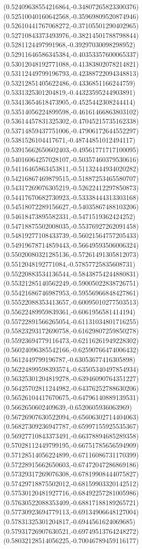 \documentclass[12pt]{article}
\theoremstyle{plain}
\theoremstyle{definition}
\theoremstyle{remark}
\begin{document}
\begin{figure}
{  (0.52409638554216864,-0.34807265823300376)%
  (0.52510040160642568,-0.35969809520874946)%
  (0.52610441767068272,-0.37105501290402965)%
  (0.52710843373493976,-0.38214501788798844)%
  (0.5281124497991968,-0.39297030098298952)%
  (0.52911646586345384,-0.40353357600065337)%
  (0.53012048192771088,-0.41383802078214821)%
  (0.53112449799196793,-0.42388722094348813)%
  (0.53212851405622486,-0.4336851166244759)%
  (0.5331325301204819,-0.44323595244903891)%
  (0.53413654618473905,-0.4525442308244414)%
  (0.53514056224899598,-0.46161466863803102)%
  (0.53614457831325302,-0.47045215735162338)%
  (0.53714859437751006,-0.47906172644552297)%
  (0.5381526104417671,-0.48744851012494117)%
  (0.53915662650602403,-0.49561771717100095)%
  (0.54016064257028107,-0.50357460379530616)%
  (0.54116465863453811,-0.51132444934020282)%
  (0.54216867469879515,-0.51887253465580707)%
  (0.54317269076305219,-0.52622412297850873)%
  (0.54417670682730923,-0.53338444313303168)%
  (0.54518072289156627,-0.54035867488103206)%
  (0.54618473895582331,-0.5471519362424252)%
  (0.54718875502008035,-0.55376927262091458)%
  (0.54819277108433739,-0.56021564757205433)%
  (0.54919678714859443,-0.56649593506006324)%
  (0.55020080321285136,-0.57261491305812073)%
  (0.5512048192771084,-0.57857725835608731)%
  (0.55220883534136544,-0.58438754244880831)%
  (0.55321285140562249,-0.59005022838726751)%
  (0.55421686746987953,-0.59556966848427861)%
  (0.55522088353413657,-0.60095010277503513)%
  (0.55622489959839361,-0.6061956581414194)%
  (0.55722891566265054,-0.61131034801716255)%
  (0.55823293172690758,-0.61629807259850278)%
  (0.55923694779116473,-0.62116261949228302)%
  (0.56024096385542166,-0.62590766474006432)%
  (0.5612449799196787,-0.63053677416305898)%
  (0.56224899598393574,-0.63505340497854934)%
  (0.56325301204819278,-0.63946090764351227)%
  (0.56425702811244982,-0.64376252788630206)%
  (0.56526104417670675,-0.64796140889139531)%
  (0.5662650602409639,-0.6520605936063969)%
  (0.56726907630522094,-0.65606302714404063)%
  (0.56827309236947787,-0.65997155925535367)%
  (0.56927710843373491,-0.66378894685289358)%
  (0.57028112449799195,-0.66751785656594909)%
  (0.57128514056224899,-0.67116086731170399)%
  (0.57228915662650603,-0.67472047286869186)%
  (0.57329317269076308,-0.67819908444075827)%
  (0.57429718875502012,-0.68159903320142512)%
  (0.57530120481927716,-0.68492257281005986)%
  (0.57630522088353409,-0.68817188189265721)%
  (0.57730923694779113,-0.69134906648127004)%
  (0.57831325301204817,-0.6944561624069685)%
  (0.57931726907630521,-0.69749513764248272)%
  (0.58032128514056225,-0.70046789459116177)%
}
\end{figure}
\end{document}

